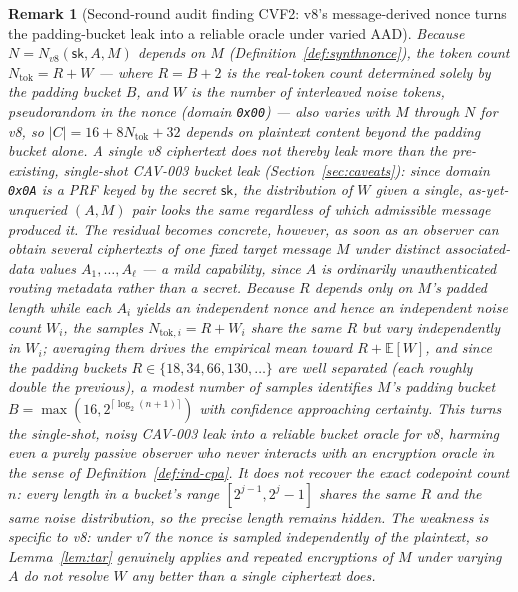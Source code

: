 \documentclass[11pt,a4paper]{article}
\newtheorem{remark}[theorem]{Remark}
\begin{document}
\begin{remark}[Second-round audit finding CVF2: v8's message-derived nonce turns the padding-bucket leak into a reliable oracle under varied AAD]
\label{rem:v8-length-oracle}
Because $N=N_{v8}(\mathsf{sk},A,M)$ depends on $M$ (Definition~\ref{def:synthnonce}),
the token count $N_{\mathrm{tok}}=R+W$ --- where $R=B+2$ is the real-token
count determined solely by the padding bucket $B$, and $W$ is the number
of interleaved noise tokens, pseudorandom in the nonce (domain
\texttt{0x00}) --- also varies with $M$ through $N$ for v8, so
$|C|=16+8N_{\mathrm{tok}}+32$ depends on plaintext content beyond the
padding bucket alone. A single v8 ciphertext does not thereby leak more
than the pre-existing, single-shot CAV-003 bucket leak (Section~\ref{sec:caveats}):
since domain \texttt{0x0A} is a PRF keyed by the secret $\mathsf{sk}$, the
distribution of $W$ given a single, as-yet-unqueried $(A,M)$ pair looks
the same regardless of which admissible message produced it. The residual
becomes concrete, however, as soon as an observer can obtain
\emph{several} ciphertexts of one fixed target message $M$ under distinct
associated-data values $A_1,\ldots,A_\ell$ --- a mild capability, since $A$
is ordinarily unauthenticated routing metadata rather than a secret.
Because $R$ depends only on $M$'s padded length while each $A_i$ yields an
independent nonce and hence an independent noise count $W_i$, the samples
$N_{\mathrm{tok},i}=R+W_i$ share the same $R$ but vary independently in
$W_i$; averaging them drives the empirical mean toward
$R+\mathbb{E}[W]$, and since the padding buckets
$R\in\{18,34,66,130,\ldots\}$ are well separated (each roughly double the
previous), a modest number of samples identifies $M$'s padding bucket
$B=\max(16,2^{\lceil\log_2(n+1)\rceil})$ with confidence approaching
certainty. This turns the single-shot, noisy CAV-003 leak into a reliable
bucket oracle for v8, harming even a purely passive observer who never
interacts with an encryption oracle in the sense of
Definition~\ref{def:ind-cpa}. It does \emph{not} recover the exact
codepoint count $n$: every length in a bucket's range
$[2^{j-1},2^j-1]$ shares the same $R$ and the same noise distribution, so
the precise length remains hidden. The weakness is specific to v8: under
v7 the nonce is sampled independently of the plaintext, so
Lemma~\ref{lem:tar} genuinely applies and repeated encryptions of $M$
under varying $A$ do not resolve $W$ any better than a single ciphertext
does.


\end{remark}
\end{document}
